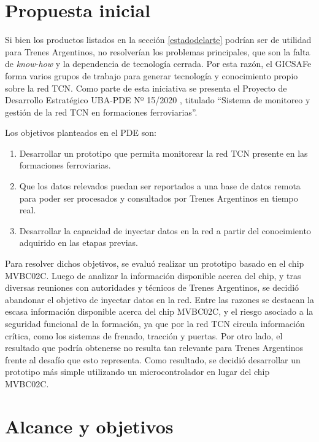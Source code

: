 \pagebreak

\section{Propuesta inicial}

Si bien los productos listados en la sección \ref{estadodelarte} podrían ser de utilidad para Trenes Argentinos, no resolverían los problemas principales, que son la falta de \emph{know-how} y la dependencia de tecnología cerrada. Por esta razón, el GICSAFe forma varios grupos de trabajo para generar tecnología y conocimiento propio sobre la red TCN. Como parte de esta iniciativa se presenta el Proyecto de Desarrollo Estratégico UBA-PDE Nº 15/2020 \cite{pde2020}, titulado ``Sistema de monitoreo y gestión de la red TCN en formaciones ferroviarias''.

Los objetivos planteados en el PDE son:

\begin{enumerate}
\item Desarrollar un prototipo que permita monitorear la red TCN presente en las formaciones ferroviarias.
\item Que los datos relevados puedan ser reportados a una base de datos remota para poder ser procesados y consultados por Trenes Argentinos en tiempo real.
\item Desarrollar la capacidad de inyectar datos en la red a partir del conocimiento adquirido en las etapas previas.
\end{enumerate}

Para resolver dichos objetivos, se evaluó realizar un prototipo basado en el chip MVBC02C.
Luego de analizar la información disponible acerca del chip, y tras diversas reuniones con autoridades y técnicos de Trenes Argentinos, se decidió abandonar el objetivo de inyectar datos en la red.
Entre las razones se destacan la escasa información disponible acerca del chip MVBC02C, y el riesgo asociado a la seguridad funcional de la formación, ya que por la red TCN circula información crítica, como los sistemas de frenado, tracción y puertas.
Por otro lado, el resultado que podría obtenerse no resulta tan relevante para Trenes Argentinos frente al desafío que esto representa.
Como resultado, se decidió desarrollar un prototipo más simple utilizando un microcontrolador en lugar del chip MVBC02C.

\section{Alcance y objetivos}

